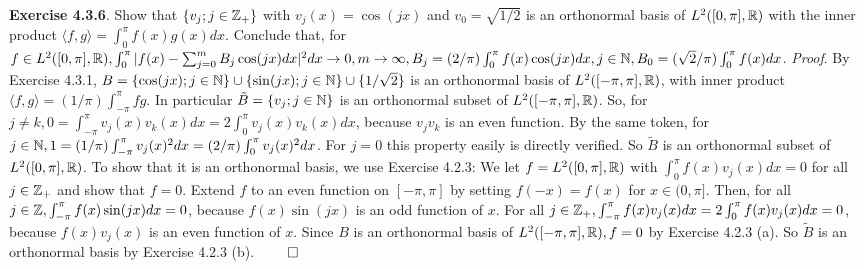 {\bf Exercise 4.3.6}. Show that $\{v_j;j\in\mathbb{Z}_+\}$ with $v_j(x) = \cos(jx)$ and $v_0=\sqrt{1/2}$ is an orthonormal basis of $L^2([0,\pi],\mathbb{R})$ with the inner product $\langle f,g \rangle = \int_0^{\pi}f(x)g(x)dx$. Conclude that, for $f \in L^2([0,\pi],\mathbb{R}), \int_0^{\pi}|f(x)-\sum_{j=0}^m B_j\cos(jx)dx|^2dx \rightarrow 0, m \rightarrow \infty, B_j=(2/\pi)\int_0^{\pi}f(x)\cos(jx)dx, j \in \mathbb{N}, B_0=(\sqrt{2}/\pi)\int_0^{\pi}f(x)dx$. {\it Proof}. By Exercise 4.3.1, $B=\{\cos(jx);j\in\mathbb{N}\}\cup \{\sin(jx);j\in\mathbb{N}\}\cup \{1/\sqrt{2}\}$ is an orthonormal basis of $L^2([-\pi,\pi],\mathbb{R})$, with inner product $\langle f,g \rangle = (1/\pi)\int_{-\pi}^{\pi}fg$. In particular $\tilde{B} = \{v_j;j\in\mathbb{N}\}$ is an orthonormal subset of $L^2([-\pi,\pi],\mathbb{R})$. So, for $j \neq k, 0 = \int_{-\pi}^{\pi}v_j(x) v_k(x) dx=2\int_0^{\pi}v_j(x) v_k(x)dx$, because $v_j v_k$ is an even function. By the same token, for $j\in \mathbb{N}, 1 = (1/\pi)\int_{-\pi}^{\pi}v_j(x)^2 dx= (2/\pi)\int_0^{\pi}v_j(x)^2 dx$. For $j = 0$ this property easily is directly verified. So $\tilde{B}$ is an orthonormal subset of $L^2([0,\pi], \mathbb{R})$. To show that it is an orthonormal basis, we use Exercise 4.2.3:  We let $f=L^2([0,\pi], \mathbb{R})$ with $\int_0^{\pi}f(x)v_j(x)dx=0$ for all $j \in \mathbb{Z}_+$ and show that $f=0$. Extend $f$ to an even function on $[-\pi,\pi]$ by setting $f(-x)=f(x)$ for $x \in (0,\pi]$. Then, for all $j \in \mathbb{Z}, \int_{-\pi}^{\pi}f(x)\sin(jx)dx=0$, because $f(x)\sin(jx)$ is an odd function of $x$. For all $j \in \mathbb{Z}_+, \int_{-\pi}^{\pi}f(x)v_j(x)dx=2\int_0^{\pi}f(x)v_j(x)dx=0$, because $f(x)v_j(x)$ is an even function of $x$. Since $B$ is an orthonormal basis of $L^2([-\pi,\pi],\mathbb{R}), f=0$ by Exercise 4.2.3 (a). So $\tilde{B}$ is an orthonormal basis by Exercise 4.2.3 (b).  $\qed$